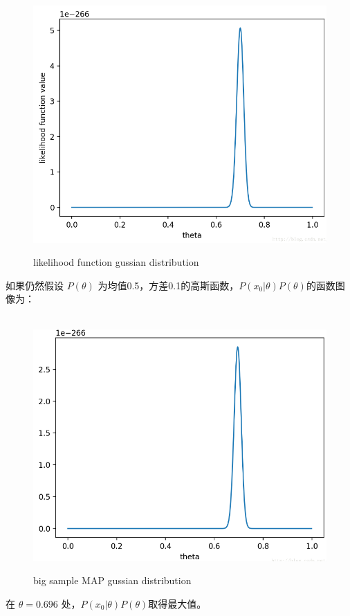 \documentclass[12pt]{ctexart}%
\begin{document}
					\begin{figure}[H]
						\vspace{-0.5cm}  %
						\setlength{\abovecaptionskip}{-0.2cm}   %
						\centering
						\includegraphics[scale=0.4]{likelihood_function_gussian_distribution.png}
						\renewcommand{\figurename}{Fig} %
						\caption{likelihood function gussian distribution}
						\label{fig:6}
					\end{figure}
			如果仍然假设 $P(\theta)$ 为均值0.5，方差0.1的高斯函数，$P(x_0|\theta)P(\theta)$的函数图像为：
					\begin{figure}[H]
						\vspace{-0.5cm}  %
						\setlength{\abovecaptionskip}{-0.2cm}   %
						\centering
						\includegraphics[scale=0.4]{big_sample_MAP_gussian_distribution.png}
						\renewcommand{\figurename}{Fig} %
						\caption{big sample MAP gussian distribution}
						\label{fig:7}
					\end{figure}
			在 $\theta=0.696$ 处，$P(x_0|\theta)P(\theta)$取得最大值。
			
\end{document}
